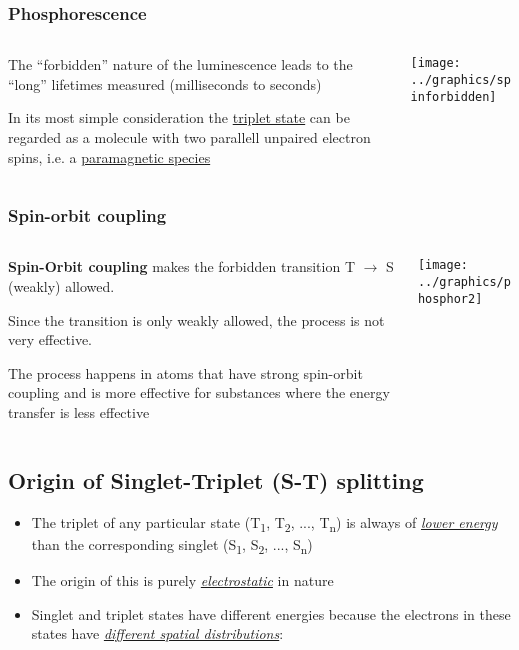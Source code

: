 \documentclass[a4paper,12pt,titlepage]{article}
\begin{document}
\begin{frame}
\frametitle{Phosphorescence}
\begin{columns}[onlytextwidth]
\begin{column}{.5\textwidth}
The ``forbidden'' nature of the luminescence leads to the ``long'' lifetimes measured (milliseconds to seconds)

In its most simple consideration the \underline{triplet state} can be regarded as a molecule with two parallell unpaired electron spins, i.e. a \underline{paramagnetic species}

\end{column}
\begin{column}{.5\textwidth}

\texttt{[image: ../graphics/spinforbidden]}

\end{column}
\end{columns}
\end{frame}

\begin{frame}
\frametitle{Spin-orbit coupling}
\begin{columns}[onlytextwidth]
\begin{column}{.5\textwidth}
\textbf{Spin-Orbit coupling} makes the forbidden transition T \(\rightarrow\) S (weakly) allowed.

Since the transition is only weakly allowed, the process is not very effective.

The process happens in atoms that have strong spin-orbit coupling and is more effective for substances where the energy transfer is less effective

\end{column}
\begin{column}{.5\textwidth}

\texttt{[image: ../graphics/phosphor2]}
\end{column}
\end{columns}
\end{frame}

\subsection{Origin of Singlet-Triplet (S-T) splitting}
\begin{frame}
\begin{itemize}
\item The triplet of any particular state (T\textsubscript{1}, T\textsubscript{2}, ..., T\textsubscript{n}) is always of \textit{\underline{lower energy}} than the corresponding singlet (S\textsubscript{1}, S\textsubscript{2}, ..., S\textsubscript{n})
\item The origin of this is purely \textit{\underline{electrostatic}} in nature
\item Singlet and triplet states have different energies because the electrons in these states have \textit{\underline{different spatial distributions}}: 	
\end{itemize}
\end{frame}
\end{document}
